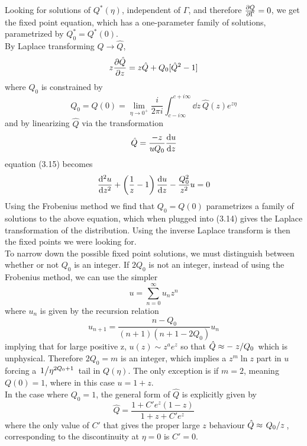 \documentclass[../sdrg,../../main.tex]{subfiles}
\begin{document}
Looking for solutions of $Q^{*}(\eta)$, independent of $\Gamma$, and therefore $\pdv{Q}{\Gamma}=0$, we get the fixed point equation, which has a one-parameter family of solutions, parametrized by $Q_{0}^{*}=Q^{*}(0)$.\\

By Laplace transforming $Q\rightarrow \hat{Q}$,
\begin{equation}
    z\pdv{\hat{Q}}{z}=z\hat{Q}+Q_{0}[\hat{Q}^{2}-1]
\end{equation}
where $Q_{0}$ is constrained by
\begin{equation}
    Q_{0}=Q(0)=\lim_{\eta\rightarrow0^{+}} \frac{i}{2\pi i}\int_{c-i\infty}^{c+i\infty}\dd z\ \hat{Q}(z)e^{z\eta}
\end{equation}
and by linearizing $\hat{Q}$ via the transformation
\begin{equation}
    \hat{Q}=\frac{-z}{uQ_{0}}\dv{u}{z}
\end{equation}
equation (3.15) becomes
\begin{equation}
    \dv[2]{u}{z}+\left(\frac{1}{z}-1\right)\dv{u}{z}-\frac{Q_0^2}{z^2}u=0
\end{equation}
Using the Frobenius method\cite{fernandez} we find that $Q_{0}=Q(0)$ parametrizes a family of solutions to the above equation, which when plugged into (3.14) gives the Laplace transformation of the distribution. Using the inverse Laplace transform is then the fixed points we were looking for.\\

To narrow down the possible fixed point solutions, we must distinguish between whether or not $Q_{0}$ is an integer. If $2Q_{0}$ is not an integer, instead of using the Frobenius method, we can use the simpler
\begin{equation}
    u = \sum_{n=0}^{\infty}u_nz^{n}
\end{equation}
where $u_{n}$ is given by the recursion relation
\begin{equation}
    u_{n+1}=\frac{n-Q_{0}}{(n+1)(n+1-2Q_{0})}u_{n}
\end{equation}
implying that for large positive z, $u(z)\sim z^{a}e^{z}$ so that $\hat{Q}\approx-\flatfrac{z}{Q_{0}}$ which is unphysical\cite{fisher}. Therefore $2Q_{0}=m$ is an integer, which implies a $z^{m}\ln{z}$ part in $u$\cite{fisher} forcing a $\flatfrac{1}{\eta^{2Q_{0}+1}}$ tail in $Q(\eta)$. The only exception is if $m=2$, meaning $Q(0)=1$, where in this case $u=1+z$.\\

In the case where $Q_{0}=1$, the general form of $\hat{Q}$ is explicitly given by
\begin{equation}
    \hat{Q}=\frac{1+C'e^z(1-z)}{1+z+C'e^z}
\end{equation}
where the only value of $C'$ that gives the proper large $z$ behaviour $\hat{Q}\approx\flatfrac{Q_{0}}{z}$, corresponding to the discontinuity at $\eta=0$ is $C'=0$.\\
\end{document}
